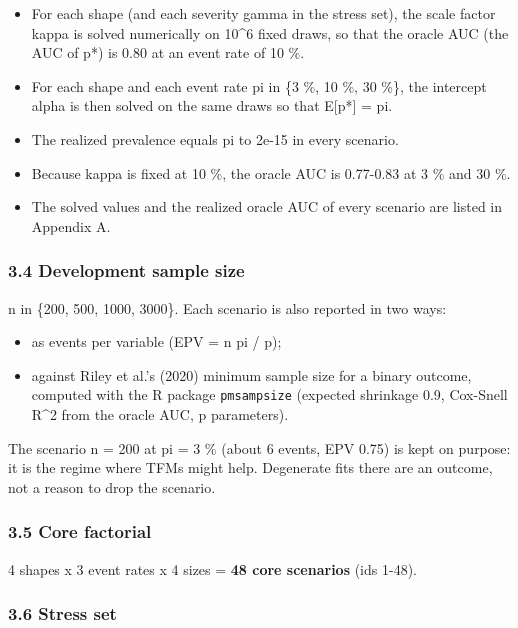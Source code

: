 \documentclass[
  10pt,
]{article}
\providecommand{\tightlist}{%
  \setlength{\itemsep}{0pt}\setlength{\parskip}{0pt}}
\begin{document}
\begin{itemize}
\tightlist
\item
  For each shape (and each severity gamma in the stress
  set), the scale factor kappa is solved numerically on
  10\^{}6 fixed draws, so that the oracle AUC (the AUC of
  p*) is 0.80 at an event rate of 10 \%.
\item
  For each shape and each event rate pi in \{3 \%, 10 \%, 30
  \%\}, the intercept alpha is then solved on the same draws
  so that E{[}p*{]} = pi.
\item
  The realized prevalence equals pi to 2e-15 in every
  scenario.
\item
  Because kappa is fixed at 10 \%, the oracle AUC is
  0.77-0.83 at 3 \% and 30 \%.
\item
  The solved values and the realized oracle AUC of every
  scenario are listed in Appendix A.
\end{itemize}

\subsubsection{3.4 Development sample
size}\label{development-sample-size}

n in \{200, 500, 1000, 3000\}. Each scenario is also
reported in two ways:

\begin{itemize}
\tightlist
\item
  as events per variable (EPV = n pi / p);
\item
  against Riley et al.'s (2020) minimum sample size for a
  binary outcome, computed with the R package
  \texttt{pmsampsize} (expected shrinkage 0.9, Cox-Snell
  R\^{}2 from the oracle AUC, p parameters).
\end{itemize}

The scenario n = 200 at pi = 3 \% (about 6 events, EPV 0.75)
is kept on purpose: it is the regime where TFMs might help.
Degenerate fits there are an outcome, not a reason to drop
the scenario.

\subsubsection{3.5 Core factorial}\label{core-factorial}

4 shapes x 3 event rates x 4 sizes = \textbf{48 core
scenarios} (ids 1-48).

\subsubsection{3.6 Stress set}\label{stress-set}
\end{document}
